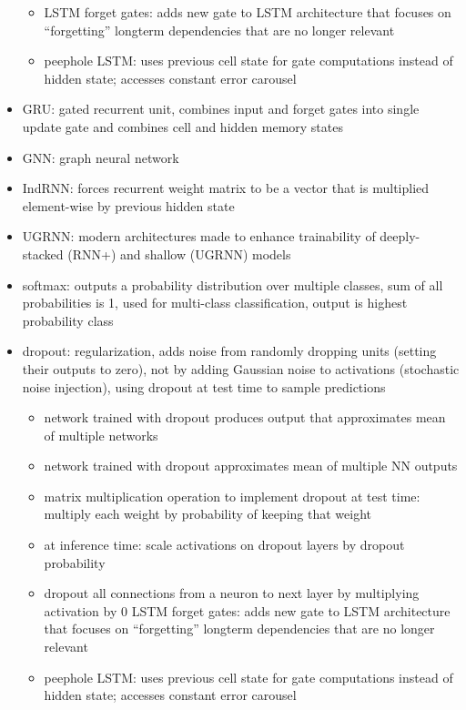 \documentclass[10pt]{article}
\begin{document}
\begin{itemize}[label=\(\star\), leftmargin=1em, itemsep=-0.3em]
\begin{itemize}[label=\(\star\), leftmargin=1em, itemsep=-0.3em]
        \item LSTM forget gates: adds new gate to LSTM architecture that focuses on “forgetting” longterm dependencies that are no longer relevant
        \item peephole LSTM: uses previous cell state for gate computations instead of hidden state; accesses constant error carousel
    \end{itemize}
    \item GRU: gated recurrent unit, combines input and forget gates into single update gate and combines cell and hidden memory states
    \item GNN: graph neural network
    \item IndRNN: forces recurrent weight matrix to be a vector that is multiplied element-wise by previous hidden state
    \item UGRNN: modern architectures made to enhance trainability of deeply-stacked (RNN+) and shallow (UGRNN) models
    \item softmax: outputs a probability distribution over multiple classes, sum of all probabilities is 1, used for multi-class classification, output is highest probability class
    \item dropout: regularization, adds noise from randomly dropping units (setting their outputs to zero), not by adding Gaussian noise to activations (stochastic noise injection), using dropout at test time to sample predictions
    \begin{itemize}[label=\(\star\), leftmargin=1em, itemsep=-0.3em]
        \item network trained with dropout produces output that approximates mean of multiple networks
        \item network trained with dropout approximates mean of multiple NN outputs
        \item matrix multiplication operation to implement dropout at test time: multiply each weight by probability of keeping that weight
        \item at inference time: scale activations on dropout layers by dropout probability
        \item dropout all connections from a neuron to next layer by multiplying activation by 0
        LSTM forget gates: adds new gate to LSTM architecture that focuses on “forgetting” longterm dependencies that are no longer relevant
        \item peephole LSTM: uses previous cell state for gate computations instead of hidden state; accesses constant error carousel
    \end{itemize}
\end{itemize}
\end{document}
